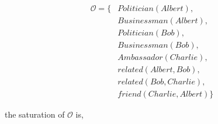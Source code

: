 \begin{equation*}
    \begin{aligned}
        \mathcal{O} = \{ & Politician(Albert),     \\
                         & Businessman(Albert),    \\
                         & Politician(Bob),        \\
                         & Businessman(Bob),       \\
                         & Ambassador(Charlie),    \\
                         & related(Albert, Bob),   \\
                         & related(Bob, Charlie),  \\ 
                         & friend(Charlie, Albert) \}
    \end{aligned}
\end{equation*}

the saturation of $\mathcal{O}$ is,


